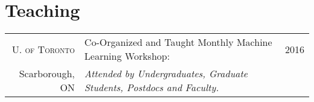 \documentclass[10pt]{article} %
\begin{document}
{%


\section{Teaching}

\begin{tabular}{>{\hfill}r|p{11.2cm}r}


\textsc{U. of Toronto} & Co-Organized and Taught Monthly Machine Learning Workshop: & 2016 \\
Scarborough, ON & \hspace{0.25cm} {\it Attended by Undergraduates, Graduate Students, Postdocs and Faculty.} \\


\end{tabular}}
\end{document}
